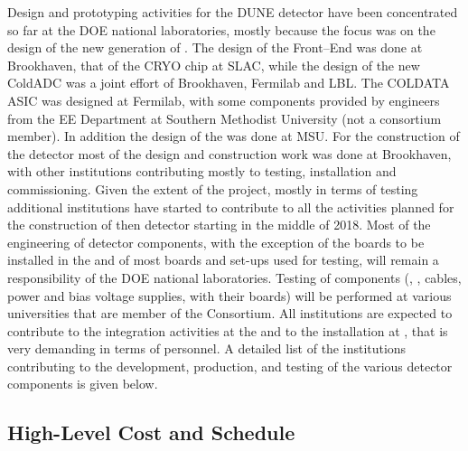 Design and prototyping activities for the  DUNE detector have 
been concentrated so far at the DOE national laboratories, mostly
because the focus was on the design of the new generation of 
. The design of the Front--End  was
done at Brookhaven, that of the CRYO chip at SLAC, while the
design of the new ColdADC was a joint effort of Brookhaven,
Fermilab and LBL. The COLDATA ASIC was designed at Fermilab, with
some components provided by engineers from the EE Department
at Southern Methodist University (not a consortium member).
In addition the design of the  was done at MSU.
For the construction of the  detector most of the
design and construction work was done at Brookhaven, with other
institutions contributing mostly to testing, installation and
commissioning. Given the extent of the project, mostly in
terms of testing additional institutions have started to contribute
to all the activities planned for the construction of then 
 detector starting in the middle of 2018. Most
of the engineering of detector components, with the exception
of the boards to be installed in the  and of
most boards and set-ups used for testing, will remain a responsibility
of the DOE national laboratories. Testing of components
(, , cables, power and bias voltage supplies,
 with their boards) will be performed at various
universities that are member of the Consortium. All institutions
are expected to contribute to the integration activities at
the  and to the installation at \surf, that is very
demanding in terms of personnel. A detailed list of the 
institutions contributing to the development, production, and
testing of the various detector components is given below.

\subsection{High-Level Cost and Schedule}
\label{sec:fdsp-tpcelec-management-cost}

